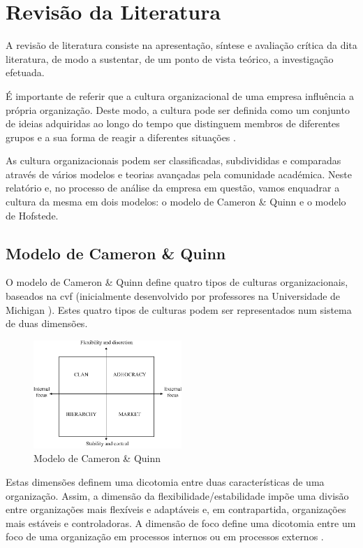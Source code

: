 
\section{Revisão da Literatura}

A revisão de literatura consiste na apresentação, síntese e avaliação crítica da dita literatura, de modo a sustentar, de um ponto de vista teórico, a investigação efetuada.

É importante de referir que a cultura organizacional de uma empresa influência a própria organização. Deste modo, a cultura pode ser definida como um conjunto de ideias adquiridas ao longo do tempo que distinguem membros de diferentes grupos e a sua forma de reagir a diferentes situações \parencite{Schein_1990,Ravasi_Schultz_2006}.

As cultura organizacionais podem ser classificadas, subdivididas e comparadas através de vários modelos e teorias avançadas pela comunidade académica. Neste relatório e, no processo de análise da empresa em questão, vamos enquadrar a cultura da mesma em dois modelos: o modelo de Cameron \& Quinn e o modelo de Hofstede.

\subsection{Modelo de Cameron \& Quinn}

O modelo de Cameron \& Quinn \parencite{Cameron_Quinn_2011} define quatro tipos de culturas organizacionais, baseados na \acrfull{cvf} (inicialmente desenvolvido por professores na Universidade de Michigan \parencite{10.2307/3380029}). Estes quatro tipos de culturas podem ser representados num sistema de duas dimensões.

\begin{figure}[h]
\centering
\includegraphics[width=0.5\textwidth]{cvf}
\caption{Modelo de Cameron \& Quinn}
\end{figure}

Estas dimensões definem uma dicotomia entre duas características de uma organização. Assim, a dimensão da flexibilidade/estabilidade impõe uma divisão entre organizações mais flexíveis e adaptáveis e, em contrapartida, organizações mais estáveis e controladoras. A dimensão de foco define uma dicotomia entre um foco de uma organização em processos internos ou em processos externos \parencite{diagnosing}.

